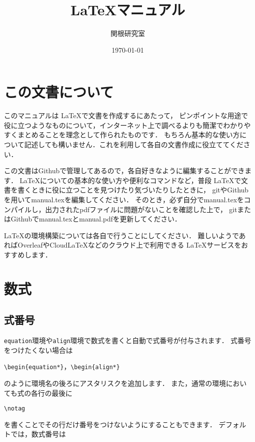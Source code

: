 \documentclass[a4paper,11pt,titlepage]{jsarticle}
\numberwithin{equation}{section}
\theoremstyle{definition}
\begin{document}
\title{\LaTeX マニュアル}
\author{関根研究室}
\date{\today}
\maketitle

\tableofcontents

\newpage

\section{この文書について}

このマニュアルは \LaTeX で文書を作成するにあたって，
ピンポイントな用途で役に立つようなものについて，インターネット上で調べるよりも簡潔でわかりやすくまとめることを理念として作られたものです．
もちろん基本的な使い方について記述しても構いません．これを利用して各自の文書作成に役立ててください．

この文書はGithubで管理してあるので，各自好きなように編集することができます．
\LaTeX についての基本的な使い方や便利なコマンドなど，普段 \LaTeX で文書を書くときに役に立つことを見つけたり気づいたりしたときに，
gitやGithubを用いてmanual.texを編集してください．
そのとき，必ず自分でmanual.texをコンパイルし，出力されたpdfファイルに問題がないことを確認した上で，
gitまたはGithubでmanual.texとmanual.pdfを更新してください．

\LaTeX の環境構築については各自で行うことにしてください．
難しいようであればOverleafやCloudLaTeXなどのクラウド上で利用できる \LaTeX サービスをおすすめします．

\newpage

\section{数式}

\subsection{式番号}

\verb|equation|環境や\verb|align|環境で数式を書くと自動で式番号が付与されます．
式番号をつけたくない場合は
\begin{center}
    \verb|\begin{equation*}|，\verb|\begin{align*}|
\end{center}
のように環境名の後ろにアスタリスクを追加します．
また，通常の環境においても式の各行の最後に
\begin{center}
    \verb|\notag|
\end{center}
を書くことでその行だけ番号をつけないようにすることもできます．
デフォルトでは，数式番号は
\end{document}
